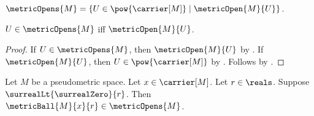 \begin{definition}\label{metric_opens}
    $\metricOpens{M}=
        \{U\in\pow{\carrier[M]}\mid\metricOpen{M}{U}\}$.
\end{definition}

\begin{proposition}\label{metric_opens_iff}
    $U\in\metricOpens{M}$ iff $\metricOpen{M}{U}$.
\end{proposition}
\begin{proof}
    If $U\in\metricOpens{M}$, then $\metricOpen{M}{U}$
        by .
    If $\metricOpen{M}{U}$, then $U\in\pow{\carrier[M]}$
        by .
    Follows by .
\end{proof}

\begin{theorem}\label{metric_ball_is_open}
    Let $M$ be a pseudometric space.
    Let $x\in\carrier[M]$.
    Let $r\in\reals$.
    Suppose $\surrealLt{\surrealZero}{r}$.
    Then $\metricBall{M}{x}{r}\in\metricOpens{M}$.
\end{theorem}
